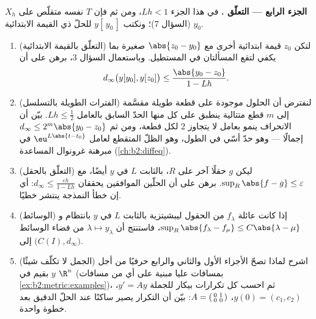 \begin{problem}
\medskip
\noindent\textbf{الجزء الرابع --- التعلّق .} في هذا
الجزء $Lh < 1$، ومن ثم فإن $T$ نفسه متقلّص على $X_h$ (السؤال
7)؛ ونكتب $y[\,y_0\,]$ للحلّ ذي القيمة الابتدائية
$y_0$.
\begin{enumerate}[resume]
  \item (التعلّق بالقيمة الابتدائية) لتكن $z_0$ قيمة
        ابتدائية أخرى مع $\abs{z_0 - y_0}$ صغيرة بما يكفي
        لتقع المسألتان في المستطيل. وباستعمال السؤال 3،
        برهن على أن
        \[
        d_\infty\bigl(y[y_0], y[z_0]\bigr) \leq
        \frac{\abs{y_0 - z_0}}{1 - Lh}.
        \]
  \item (الفترات الطويلة بالتسلسل) لنفترض أن الحلول موجودة
        على قطعة طويلة مقسَّمة إلى $m$ قطع متتالية ينطبق
        على كل منها الحدّ السابق بالعامل $Lh \leq
        \frac12$. بيّن أن الانحراف ينمو بعامل لا يتجاوز
        $2$ لكل قطعة، ومن ثم $d_\infty \leq 2^m\abs{y_0 - z_0}$
        إجمالًا --- وهو حدّ أسّي في الطول، وهو الظلّ
        المتقطع لعامل $\eu^{L\abs{t - t_0}}$ في مبرهنة غرونوال المساعدة
        (\cref{ch:b2:diffeq}).
  \item (التعلّق بالحقل) ليكن $g$ حقلًا آخر على
        $R$،  بالثابت $L$ في $y$ أيضًا، مع $\sup_R \abs{f - g}
        \leq \varepsilon$. برهن على أن الحلّين
        الموافقين يحققان $d_\infty \leq
        \frac{\varepsilon h}{1 - Lh}$: أي إن خطأ النمذجة
        ينتشر خطيًا.
  \item (الوسائط) إذا كانت عائلة $f_\lambda$ من الحقول
        ليبشيتزية بالثابت $L$ في $y$ بانتظام و$\sup_R\abs{f_\lambda
        - f_\mu} \leq C\abs{\lambda - \mu}$، فاستنتج أن
        $\lambda \mapsto y_\lambda$  من فضاء الوسائط
        إلى $\bigl(C(I), d_\infty\bigr)$.
  \item (الجمل لا تكلّف شيئًا) اشرح لماذا تصحّ الأجزاء الأول والثاني والرابع
        حرفيًا من أجل $y$ بقيم في $\R^n$ (بمسافات
        عليا مبنية على أي من مسافات
        \cref{ex:b2:metric:examples})، ثم احسب كل تكرارات بيكار
        للجملة $y' = Ay$، $y(0) = (c_1,
        c_2)$، $A = \begin{psmallmatrix} 0 & 1\\ 0 &
        0\end{psmallmatrix}$: بيّن أن التكرار يصير
        ساكنًا عند الحلّ الدقيق بعد خطوة واحدة.
\end{enumerate}


\end{problem}
